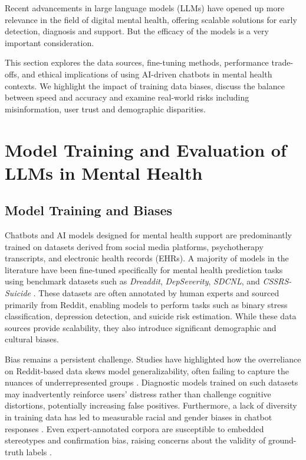 Recent advancements in large language models (LLMs) have opened up more relevance in the field of digital mental health, offering scalable solutions for early detection, diagnosis and support. 
But the efficacy of the models is a very important consideration. 
 
This section explores the data sources, fine-tuning methods, performance trade-offs, and ethical implications of using AI-driven chatbots in mental health contexts. We highlight the impact of training data biases, discuss the balance between speed and accuracy and examine real-world risks including misinformation, user trust and demographic disparities.

\section{Model Training and Evaluation of LLMs in Mental Health}

\subsection{Model Training and Biases}

Chatbots and AI models designed for mental health support are predominantly trained on datasets derived from social media platforms, psychotherapy transcripts, and electronic health records (EHRs). A majority of models in the literature have been fine-tuned specifically for mental health prediction tasks using benchmark datasets such as \textit{Dreaddit}, \textit{DepSeverity}, \textit{SDCNL}, and \textit{CSSRS-Suicide} \cite{arriba2024}. These datasets are often annotated by human experts and sourced primarily from Reddit, enabling models to perform tasks such as binary stress classification, depression detection, and suicide risk estimation. While these data sources provide scalability, they also introduce significant demographic and cultural biases.

Bias remains a persistent challenge. Studies have highlighted how the overreliance on Reddit-based data skews model generalizability, often failing to capture the nuances of underrepresented groups \cite{li2023, gbollie2023}. Diagnostic models trained on such datasets may inadvertently reinforce users’ distress rather than challenge cognitive distortions, potentially increasing false positives. Furthermore, a lack of diversity in training data has led to measurable racial and gender biases in chatbot responses \cite{arriba2024}. Even expert-annotated corpora are susceptible to embedded stereotypes and confirmation bias, raising concerns about the validity of ground-truth labels \cite{greco2023}.

